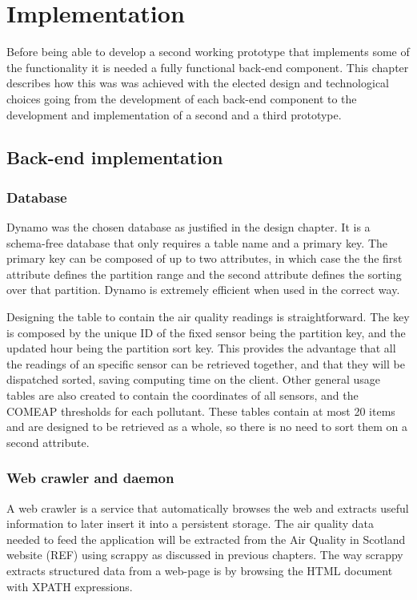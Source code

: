\chapter{Implementation}
Before being able to develop a second working prototype that implements some of the functionality it is needed a fully functional back-end component. This chapter describes how this was was achieved with the elected design and technological choices going from the development of each back-end component to the development and implementation of a second and a third prototype.
\section{Back-end implementation}

\subsection{Database}
Dynamo was the chosen database as justified in the design chapter. It is a schema-free database that only requires a table name and a primary key. The primary key can be composed of up to two attributes, in which case the the first attribute defines the partition range and the second attribute defines the sorting over that partition. Dynamo is extremely efficient when used in the correct way. 

Designing the table to contain the air quality readings is straightforward. The key is composed by the unique ID of the fixed sensor being the partition key, and the updated hour being the partition sort key. This provides the advantage that all the readings of an specific sensor can be retrieved together, and that they will be dispatched sorted, saving computing time on the client. Other general usage tables are also created to contain the coordinates of all sensors, and the COMEAP thresholds for each pollutant. These tables contain at most 20 items and are designed to be retrieved as a whole, so there is no need to sort them on a second attribute.

\subsection{Web crawler and daemon}
A web crawler is a service that automatically browses the web and extracts useful information to later insert it into a persistent storage. The air quality data needed to feed the application will be extracted from the Air Quality in Scotland website (REF) using scrappy as discussed in previous chapters. The way scrappy extracts structured data from a web-page is by browsing the HTML document with XPATH expressions. 

